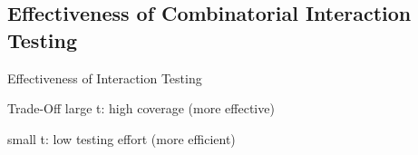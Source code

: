 
\subsection{Effectiveness of Combinatorial Interaction Testing}
\begin{frame}{\myframetitle{}}
	\begin{mycolumns}
		\begin{exampletight}{Effectiveness of Interaction Testing }
		\end{exampletight}
	\mynextcolumn
		\begin{note}{Trade-Off}
			large t: high coverage (more effective)
			
			small t: low testing effort (more efficient)
		\end{note}
	\end{mycolumns}
\end{frame}
